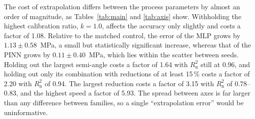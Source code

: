 The cost of extrapolation differs between the process parameters by almost an order of magnitude, as Tables~\ref{tab:main} and \ref{tab:axis} show. Withholding the highest calibration ratio, $k=1.0$, affects the accuracy only slightly and costs a factor of 1.08. Relative to the matched control, the error of the MLP grows by $1.13\pm0.58$~MPa, a small but statistically significant increase, whereas that of the PINN grows by $0.11\pm0.40$~MPa, which lies within the scatter between seeds. %
Holding out the largest semi-angle costs a factor of 1.64 with $R^2_{\mathrm{n}}$ still at 0.96, and holding out only its combination with reductions of at least 15\,\% costs a factor of 2.20 with $R^2_{\mathrm{n}}$ of 0.94. The largest reduction costs a factor of 3.15 with $R^2_{\mathrm{n}}$ of 0.78--0.83, and the highest speed a factor of 5.93. The spread between axes is far larger than any difference between families, so a single ``extrapolation error'' would be uninformative. %

